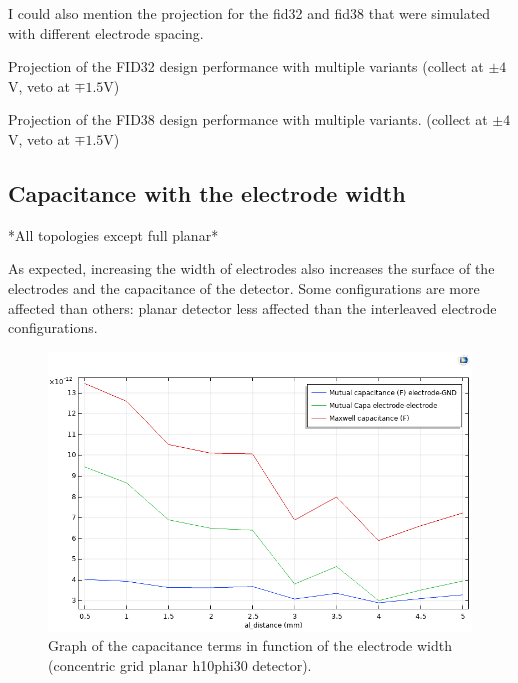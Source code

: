 I could also mention the projection for the fid32 and fid38 that were simulated with different electrode spacing.

\begin{table}[]
\centering
\resizebox{\linewidth}{!}{
	
}
\caption{Projection of the FID32 design performance with multiple variants (collect at $\pm4$V, veto at $\mp1.5$V)}
\label{tab:stream-glitch-time-cut}
\end{table}

\begin{table}[]
\centering
\resizebox{\linewidth}{!}{
	
}
\caption{Projection of the FID38 design performance with multiple variants. (collect at $\pm4$V, veto at $\mp1.5$V)}
\label{tab:stream-glitch-time-cut}
\end{table}

\subsection{Capacitance with the electrode width}

*All topologies except full planar*

As expected, increasing the width of electrodes also increases the surface of the electrodes and the capacitance of the detector.
Some configurations are more affected than others: planar detector less affected than the interleaved electrode configurations.

\begin{figure}
\centering
\includegraphics[width=\linewidth]{Figures/Electrodes/capacitance_electrode_spacing.png}
\caption{Graph of the capacitance terms in function of the electrode width (concentric grid planar h10phi30 detector).}
\label{fig:capacitance-electrode-width}
\end{figure}

